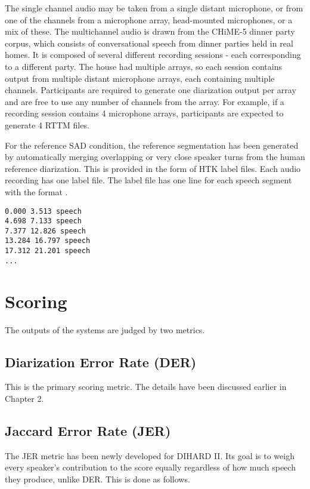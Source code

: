 The single channel audio may be taken from a single distant microphone, or from one of the channels from a microphone array, head-mounted microphones, or a mix of these. The multichannel audio is drawn from the CHiME-5 dinner party corpus, which consists of conversational speech from dinner parties held in real homes. It is composed of several different recording sessions - each corresponding to a different party. The house had multiple arrays, so each session contains output from multiple distant microphone arrays, each containing multiple channels. Participants are required to generate one diarization output per array and are free to use any number of channels from the array. For example, if a recording session contains 4 microphone arrays, participants are expected to generate 4 RTTM files.

For the reference SAD condition, the reference segmentation has been generated by automatically merging overlapping or very close speaker turns from the human reference diarization. This is provided in the form of HTK \cite{young1993htk} label files. Each audio recording has one label file. The label file has one line for each speech segment with the format .

\begin{verbatim}
0.000 3.513 speech
4.698 7.133 speech
7.377 12.826 speech
13.284 16.797 speech
17.312 21.201 speech
...
\end{verbatim}

\section{Scoring}
The outputs of the systems are judged by two metrics.

	\subsection{Diarization Error Rate (DER)}
	This is the primary scoring metric. The details have been discussed earlier in Chapter 2.
	
	\subsection{Jaccard Error Rate (JER)}
	The JER metric has been newly developed for DIHARD II. Its goal is to weigh every speaker's contribution to the score equally regardless of how much speech they produce, unlike DER. This is done as follows.
	
